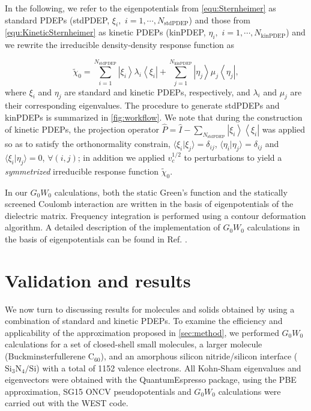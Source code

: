 \documentclass[aip,preprint]{revtex4-1}
\begin{document}
In the following, we refer to the eigenpotentials from \autoref{equ:Sternheimer} as standard PDEPs (stdPDEP, $\xi_i,\,\,i = 1, \cdots, N_\mathrm{stdPDEP}$) and those from \autoref{equ:KineticSternheimer} as kinetic PDEPs (kinPDEP, $\eta_i,\,\,i = 1, \cdots, N_\mathrm{kinPDEP}$) and we rewrite the irreducible density-density response function as

\begin{equation}
    \tilde{\chi}_0 = \sum_{i=1}^{N_\mathrm{stdPDEP}}\left|\xi_i\right\rangle\lambda_i\left\langle\xi_i\right|+\sum_{j=1}^{N_\mathrm{kinPDEP}}\left|\eta_j\right\rangle\mu_j\left\langle\eta_j\right|,
\end{equation}
where $\xi_i$ and $\eta_j$ are standard and kinetic PDEPs, respectively, and $\lambda_i$ and $\mu_j$ are their corresponding eigenvalues. The procedure to generate stdPDEPs and kinPDEPs is summarized in \autoref{fig:workflow}. We note that during the construction of kinetic PDEPs, the projection operator $\hat{P}=\hat{I}-\sum_{N_\mathrm{stdPDEP}}\left|\xi_i\right\rangle\left\langle\xi_i\right|$ was applied so as to satisfy the orthonormality constrain, $\langle\xi_i|\xi_j\rangle = \delta_{ij}$, $\langle\eta_i|\eta_j\rangle=\delta_{ij}$ and $\langle\xi_i|\eta_j\rangle=0$, $\forall (i,j)$; in addition we applied $v_c^{1/2}$ to perturbations to yield a \textit{symmetrized} irreducible response function $\tilde{\chi}_0$.

In our $G_0W_0$ calculations, both the static Green's function and the statically screened Coulomb interaction are written in the basis of eigenpotentials of the dielectric matrix. Frequency integration is performed using a contour deformation algorithm. A detailed description of  the implementation of $G_0W_0$ calculations in the basis of eigenpotentials can be found in Ref. .

\section{\label{sec:results}Validation and results}
We now turn to discussing results for molecules and solids obtained by using a combination of standard and kinetic PDEPs. To examine the efficiency and applicability of the approximation proposed in \autoref{sec:method}, we performed $G_0W_0$ calculations for a set of closed-shell small molecules, a larger molecule (Buckminsterfullerene $\mathrm{C_{60}}$), and an amorphous silicon nitride/silicon interface ($\mathrm{Si_3N_4/Si}$) with a total of 1152 valence electrons. All Kohn-Sham eigenvalues and eigenvectors were obtained with the QuantumEspresso package,\cite{QE2009,QE2017} using the PBE approximation\cite{PBEfunctional}, SG15\cite{ONCV2015} ONCV\cite{hamann2013ONCV} pseudopotentials and $G_0W_0$ calculations were carried out with the WEST code.\cite{Marco2015}%
\end{document}

